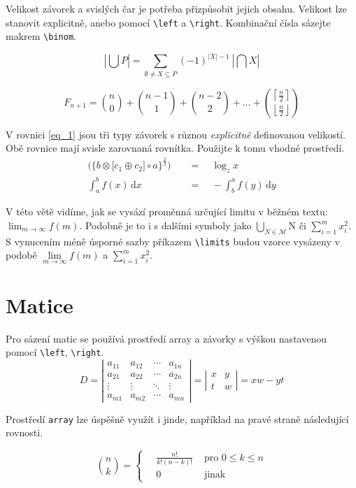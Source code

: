 \documentclass[a4paper, 11pt, twocolumn]{article}
\theoremstyle{definition}
\begin{document}
    Velikost závorek a svislých čar je potřeba přizpůsobit jejich obsahu. Velikost lze stanovit explicitně,
    anebo pomocí \verb|\left| a \verb|\right|. Kombinační čísla sázejte makrem \verb|\binom|.

    \begin{equation*}
    \left\lvert\bigcup P\right\rvert = \sum_{\emptyset \neq X \subseteq P} (-1)^{\lvert X \rvert-1} \ \left\lvert \bigcap X \right\rvert
    \end{equation*}
    
    \begin{equation*}
    F_{n+1} = \binom{n}{0} + \binom{n-1}{1}+\binom{n-2}{2}+\dots+\binom{\left\lceil\frac{n}{2}\right\rceil}{\left\lfloor\frac{n}{2}\right\rfloor}
    \end{equation*}

    \vspace{0.1cm}
    
    V rovnici \eqref{eq_1} jsou tři typy závorek s různou \emph{explicitně} definovanou velikostí. Obě rovnice mají svisle zarovnaná rovnítka. Použijte k tomu vhodné prostředí.
   \begin{align}
        \label{eq_1}
        \bigg( \Big\{ b \otimes \big[ c_1 \oplus c_2 \big] \circ a \Big\}^{\frac{2}{3}} \bigg) & \quad=\quad \log_z x \\
        \label{eq_2}
        \int_a^b f(x) \, \mathrm{d}x & \quad=\quad -\int_b^a f(y) \, \mathrm{d}y
    \end{align}

   V této větě vidíme, jak se vysází proměnná určující limitu v běžném textu: $ \lim_{m \rightarrow \infty} f(m) $. Podobně je to i s dalšími symboly jako $\bigcup_{N \in \mathcal{M}}$N či $\sum^m_{i=1}x^2_i$. S vynucením méně úsporné sazby příkazem \verb|\limits| budou vzorce vysázeny v podobě $\lim\limits_{m \rightarrow \infty} f(m)$ a $\sum\limits_{i=1}^{m} x_{i}^{2}$.


   \section{Matice}
    Pro sázení matic se používá prostředí array a závorky
    s výškou nastavenou pomocí \verb|\left|, \verb|\right|.
    \begin{equation*}
    D=\left|\begin{array}{cccc}
    a_{11} & a_{12} & \cdots & a_{1 n} \\
    a_{21} & a_{22} & \cdots & a_{2 n} \\
    \vdots & \vdots & \ddots & \vdots \\
    a_{m 1} & a_{m 2} & \cdots & a_{m n}
    \end{array}\right|=\left|\begin{array}{cc}
    x & y \\
    t & w
    \end{array}\right|=x w-y t
    \end{equation*}

    Prostředí \verb|array| lze úspěšně využít i jinde, například
    na pravé straně následující rovnosti.

    \begin{equation*}
        \binom{n}{k}= \begin{cases}\quad\frac{n !}{k !(n-k) !} & \text { pro } 0 \leq k \leq n \\
        \quad0 & \text { jinak }\end{cases}
    \end{equation*}
\end{document}
